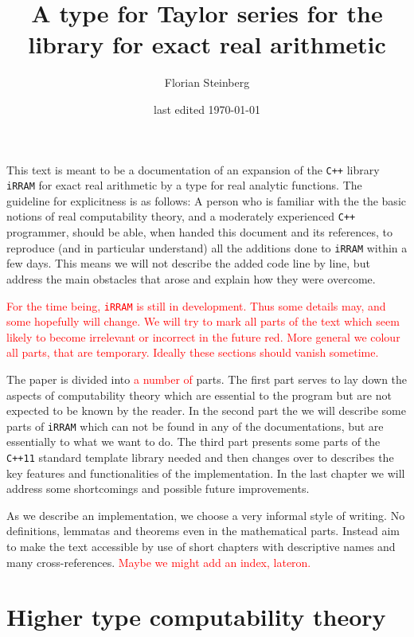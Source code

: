 \documentclass{article}
\title{A type for Taylor series for the \cc library \irram for exact real arithmetic}
\date{last edited \today}
\author{Florian Steinberg}
\newcommand{\irram}{\texttt{iRRAM}\xspace}
\newcommand{\cc}{\texttt{C++}\xspace}
\newcommand{\ccOx}{\texttt{C++11}\xspace}
\newcommand{\temp}[1]{\textcolor{red}{#1}}
\begin{document}
\maketitle
\newpage
\tableofcontents
\newpage
\section*{}

This text is meant to be a documentation of an expansion of the \cc library \irram for exact real arithmetic by a type for real analytic functions. The guideline for explicitness is as follows: A person who is familiar with the the basic notions of real computability theory, and a moderately experienced \cc programmer, should be able, when handed this document and its references, to reproduce (and in particular understand) all the additions done to \irram within a few days. This means we will not describe the added code line by line, but address the main obstacles that arose and explain how they were overcome.

\temp{For the time being, \irram is still in development. Thus some details may, and some hopefully will change. We will try to mark all parts of the text which seem likely to become irrelevant or incorrect in the future red. More general we colour all parts, that are temporary. Ideally these sections should vanish sometime.}

The paper is divided into \temp{a number of} parts. The first part serves to lay down the aspects of computability theory which are essential to the program but are not expected to be known by the reader. In the second part the we will describe some parts of \irram which can not be found in any of the documentations, but are essentially to what we want to do. The third part presents some parts of the \ccOx standard template library needed and then changes over to describes the key features and functionalities of the implementation. In the last chapter we will address some shortcomings and possible future improvements.

As we describe an implementation, we choose a very informal style of writing. No definitions, lemmatas and theorems even in the mathematical parts. Instead aim to make the text accessible by use of short chapters with descriptive names and many cross-references. \temp{Maybe we might add an index, lateron.}

\part{Higher type computability theory}
\end{document}
